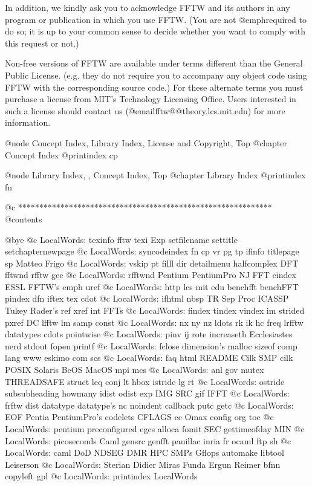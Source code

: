 In addition, we kindly ask you to acknowledge FFTW and its authors in
any program or publication in which you use FFTW.  (You are not
@emph{required} to do so; it is up to your common sense to decide
whether you want to comply with this request or not.)

Non-free versions of FFTW are available under terms different than the
General Public License. (e.g. they do not require you to accompany any
object code using FFTW with the corresponding source code.)  For these
alternate terms you must purchase a license from MIT's Technology
Licensing Office.  Users interested in such a license should contact us
(@email{fftw@@theory.lcs.mit.edu}) for more information.

@node Concept Index, Library Index, License and Copyright, Top
@chapter Concept Index
@printindex cp

@node Library Index,  , Concept Index, Top
@chapter Library Index
@printindex fn

@c ************************************************************
@contents

@bye
@c  LocalWords:  texinfo fftw texi Exp setfilename settitle setchapternewpage
@c  LocalWords:  syncodeindex fn cp vr pg tp ifinfo titlepage sp Matteo Frigo
@c  LocalWords:  vskip pt filll dir detailmenu halfcomplex DFT fftwnd rfftw gcc
@c  LocalWords:  rfftwnd Pentium PentiumPro NJ FFT cindex ESSL FFTW's emph uref
@c  LocalWords:  http lcs mit edu benchfft benchFFT pindex dfn iftex tex cdot
@c  LocalWords:  ifhtml nbsp TR Sep Proc ICASSP Tukey Rader's ref xref int FFTs
@c  LocalWords:  findex tindex vindex im strided pxref DC lfftw lm samp const
@c  LocalWords:  nx ny nz ldots rk ik hc freq lrfftw datatypes cdots pointwise
@c  LocalWords:  pinv ij rote increaseth Ecclesiastes nerd stdout fopen printf
@c  LocalWords:  fclose dimension's malloc sizeof comp lang www eskimo com scs
@c  LocalWords:  faq html README Cilk SMP cilk POSIX Solaris BeOS MacOS mpi mcs
@c  LocalWords:  anl gov mutex THREADSAFE struct leq conj lt hbox istride lg rt
@c  LocalWords:  ostride subsubheading howmany idist odist exp IMG SRC gif IFFT
@c  LocalWords:  frftw dist datatype datatype's nc noindent callback putc getc
@c  LocalWords:  EOF Pentia PentiumPro's codelets CFLAGS cc Omax config org toc
@c  LocalWords:  pentium preconfigured egcs alloca fomit SEC gettimeofday MIN
@c  LocalWords:  picoseconds Caml gensrc genfft pauillac inria fr ocaml ftp sh
@c  LocalWords:  caml DoD NDSEG DMR HPC SMPs Gflops automake libtool Leiserson
@c  LocalWords:  Sterian Didier Miras Funda Ergun Reimer bfnn copyleft gpl
@c  LocalWords:  printindex LocalWords
